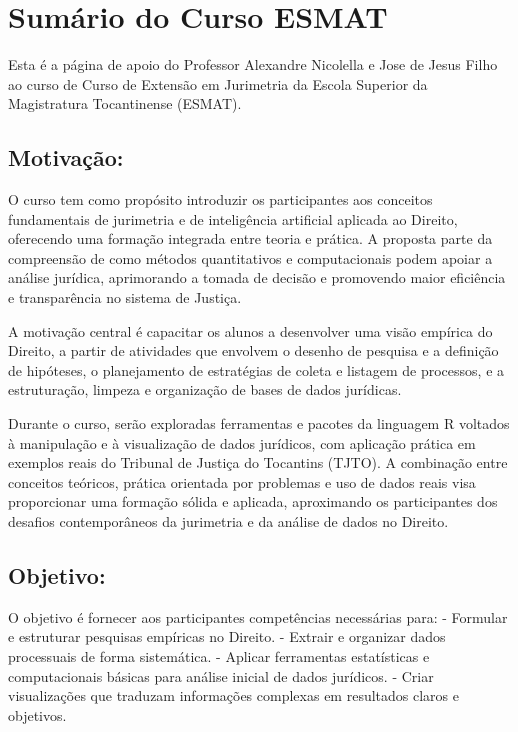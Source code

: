 \documentclass[
  letterpaper,
  DIV=11,
  numbers=noendperiod]{scrreprt}
\begin{document}
\chapter{Sumário do Curso ESMAT}\label{sumuxe1rio-do-curso-esmat}

Esta é a página de apoio do Professor Alexandre Nicolella e Jose de
Jesus Filho ao curso de Curso de Extensão em Jurimetria da Escola
Superior da Magistratura Tocantinense (ESMAT).

\section{\texorpdfstring{\textbf{Motivação}:}{Motivação:}}\label{motivauxe7uxe3o-1}

O curso tem como propósito introduzir os participantes aos conceitos
fundamentais de jurimetria e de inteligência artificial aplicada ao
Direito, oferecendo uma formação integrada entre teoria e prática. A
proposta parte da compreensão de como métodos quantitativos e
computacionais podem apoiar a análise jurídica, aprimorando a tomada de
decisão e promovendo maior eficiência e transparência no sistema de
Justiça.

A motivação central é capacitar os alunos a desenvolver uma visão
empírica do Direito, a partir de atividades que envolvem o desenho de
pesquisa e a definição de hipóteses, o planejamento de estratégias de
coleta e listagem de processos, e a estruturação, limpeza e organização
de bases de dados jurídicas.

Durante o curso, serão exploradas ferramentas e pacotes da linguagem R
voltados à manipulação e à visualização de dados jurídicos, com
aplicação prática em exemplos reais do Tribunal de Justiça do Tocantins
(TJTO). A combinação entre conceitos teóricos, prática orientada por
problemas e uso de dados reais visa proporcionar uma formação sólida e
aplicada, aproximando os participantes dos desafios contemporâneos da
jurimetria e da análise de dados no Direito.

\section{\texorpdfstring{\textbf{Objetivo}:}{Objetivo:}}\label{objetivo-1}

O objetivo é fornecer aos participantes competências necessárias para: -
Formular e estruturar pesquisas empíricas no Direito. - Extrair e
organizar dados processuais de forma sistemática. - Aplicar ferramentas
estatísticas e computacionais básicas para análise inicial de dados
jurídicos. - Criar visualizações que traduzam informações complexas em
resultados claros e objetivos.
\end{document}
